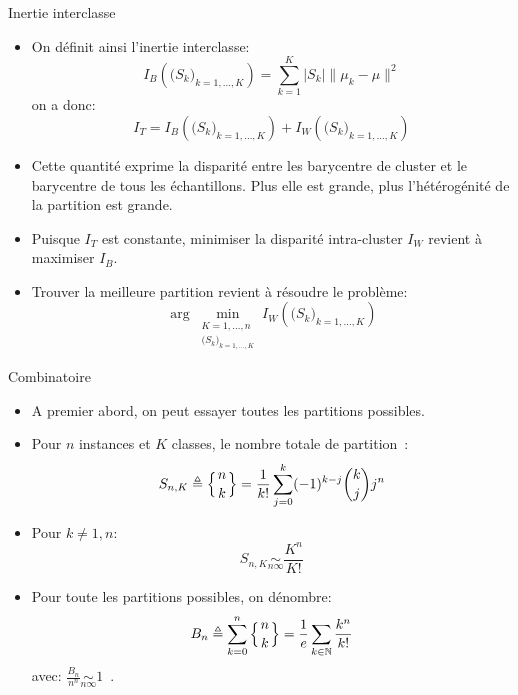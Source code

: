 \documentclass[8pt]{beamer}
\begin{document}
			\begin{frame}{Inertie interclasse}
				\begin{itemize}
					\item<1-> On définit ainsi l'inertie interclasse:
						\begin{equation}
							I_B(\big(S_k\big)_{k = 1, \dots, K}) = \sum_{k= 1}^{K} \vert S_k \vert \lVert \mu_k - \mu \rVert^2
						\end{equation}
						on a donc:
						\begin{equation}
							I_T = I_B(\big(S_k\big)_{k = 1, \dots, K}) + I_W(\big(S_k\big)_{k = 1, \dots, K})
						\end{equation}
					\item<2-> Cette quantité exprime la disparité entre les barycentre de cluster et le barycentre de tous les échantillons. Plus elle est grande, plus l'hétérogénité de la partition est grande.
					\item<3-> Puisque \(I_T\) est constante, minimiser la disparité intra-cluster \(I_W\) revient à maximiser \(I_B\).
					\item<4-> Trouver la meilleure partition revient à résoudre le problème:
						\begin{equation}
							\arg \min_{\substack{K = 1,\dots,n \\ \big(S_k\big)_{k = 1, \dots, K}}} I_W(\big(S_k\big)_{k = 1, \dots, K})
						\end{equation}
				\end{itemize}
			\end{frame}

			\begin{frame}{Combinatoire}
				\begin{itemize}
					\item<1-> A premier abord, on peut essayer toutes les partitions possibles.
					\item<2-> Pour \(n\) instances et \(K\) classes, le nombre totale de partition~\cite{StirlingWiki}:
						\begin{equation}
							S_{n,K} \triangleq \left\{ {n \atop k}\right\} = \frac{1}{k!}\sum_{j=0}^{k} (-1)^{k-j} \binom{k}{j} j^n
						\end{equation}
					\item<3-> Pour \(k \neq 1, n\):
						\begin{equation}
							S_{n,K} \underset{n\infty}{\sim} \frac{K^n}{K!}
						\end{equation}
					\item<4-> Pour toute les partitions possibles, on dénombre:
						\begin{equation}
							B_n \triangleq \sum_{k=0}^n \left\{ {n \atop k}\right\} = \frac{1}{e}\sum_{k\in\mathbb{N}} \frac{k^n}{k!}
						\end{equation}
						avec: \(\frac{B_n}{n^n} \underset{n\infty}{\sim} 1\)~\cite{BellWiki}.
				\end{itemize}
			\end{frame}
\end{document}
